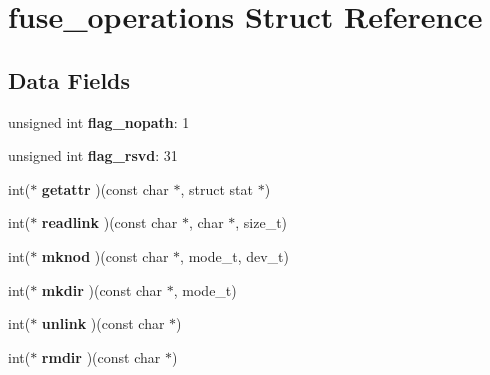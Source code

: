 \hypertarget{structfuse__operations}{}\section{fuse\+\_\+operations Struct Reference}
\label{structfuse__operations}
\subsection*{Data Fields}
\begin{DoxyCompactItemize}
\item 
unsigned int {\bfseries flag\+\_\+nopath}\+: 1\hypertarget{structfuse__operations_abd0d90b9b500f6607f9aad9ae07784d8}{}\label{structfuse__operations_abd0d90b9b500f6607f9aad9ae07784d8}

\item 
unsigned int {\bfseries flag\+\_\+rsvd}\+: 31\hypertarget{structfuse__operations_af3b3e9f21464e053e43a3d7b733a7bfa}{}\label{structfuse__operations_af3b3e9f21464e053e43a3d7b733a7bfa}

\item 
int($\ast$ {\bfseries getattr} )(const char $\ast$, struct stat $\ast$)\hypertarget{structfuse__operations_ad1fe65eb63bdf8fac5fdc953e7c643ca}{}\label{structfuse__operations_ad1fe65eb63bdf8fac5fdc953e7c643ca}

\item 
int($\ast$ {\bfseries readlink} )(const char $\ast$, char $\ast$, size\+\_\+t)\hypertarget{structfuse__operations_a0a7fe4e7fe5db55e96ef6adaf64c09e2}{}\label{structfuse__operations_a0a7fe4e7fe5db55e96ef6adaf64c09e2}

\item 
int($\ast$ {\bfseries mknod} )(const char $\ast$, mode\+\_\+t, dev\+\_\+t)\hypertarget{structfuse__operations_a086e9d012d0de2f2cdd53ba13c65ace7}{}\label{structfuse__operations_a086e9d012d0de2f2cdd53ba13c65ace7}

\item 
int($\ast$ {\bfseries mkdir} )(const char $\ast$, mode\+\_\+t)\hypertarget{structfuse__operations_a58099b7eb4078ec35b911d7dc1c49cb9}{}\label{structfuse__operations_a58099b7eb4078ec35b911d7dc1c49cb9}

\item 
int($\ast$ {\bfseries unlink} )(const char $\ast$)\hypertarget{structfuse__operations_a61c9fc784e6218b9943ce0bc49c48a3d}{}\label{structfuse__operations_a61c9fc784e6218b9943ce0bc49c48a3d}

\item 
int($\ast$ {\bfseries rmdir} )(const char $\ast$)\hypertarget{structfuse__operations_ac08fb89a4d0bd842986730d57b7a42ff}{}\label{structfuse__operations_ac08fb89a4d0bd842986730d57b7a42ff}


\end{DoxyCompactItemize}
